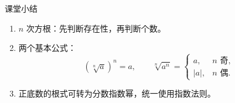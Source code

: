 \documentclass[aspectratio=169,10pt]{beamer}
\begin{document}
\begin{frame}[t]{课堂小结}
 \begin{enumerate}
  \item $n$ 次方根：先判断存在性，再判断个数。
  \item 两个基本公式：
   \[(\sqrt[n]a)^n=a,\qquad
     \sqrt[n]{a^n}=\begin{cases}a,&n\text{ 奇},\\|a|,&n\text{ 偶}.\end{cases}\]
  \item 正底数的根式可转为分数指数幂，统一使用指数法则。
 \end{enumerate}
 \gap
\end{frame}
\campusclosing[谢谢]
\end{document}
